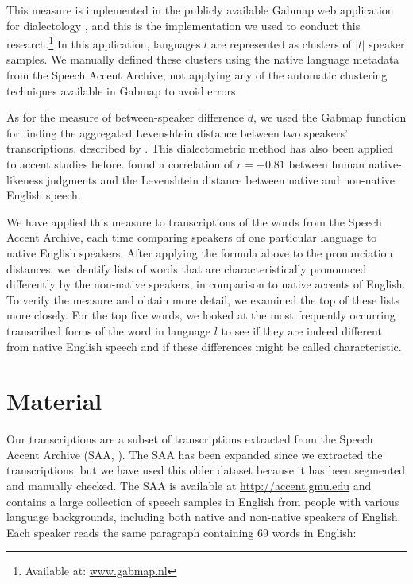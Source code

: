 \documentclass[output=paper]{LSP/langsci}
\begin{document}
This measure is implemented in the publicly available Gabmap web application for dialectology \citep{nerbonne_gabmap_2011}, and this is the implementation we used to conduct this research.\footnote{Available at: \url{www.gabmap.nl}} In this application, languages $l$ are represented as clusters of $|l|$ speaker samples. We manually defined these clusters using the native language metadata from the Speech Accent Archive, not applying any of the automatic clustering techniques available in Gabmap to avoid errors.

As for the measure of between-speaker difference $d$, we used the Gabmap function for finding the aggregated Levenshtein distance between two speakers' transcriptions, described by \citet{nerbonne_gabmap_2011}. This dialectometric method has also been applied to accent studies before. \citet{wieling_measuring_2014} found a correlation of $r = -0.81$ between human native-likeness judgments and the Levenshtein distance between native and non-native English speech.   

We have applied this measure to transcriptions of the words from the Speech Accent Archive, each time comparing speakers of one particular language to native English speakers. After applying the formula above to the pronunciation distances, we identify lists of words that are characteristically pronounced differently by the non-native speakers, in comparison to native accents of English. To verify the measure and obtain more detail, we examined the top of these lists more closely. For the top five words, we looked at the most frequently occurring transcribed forms of the word in language $l$ to see if they are indeed different from native English speech and if these differences might be called characteristic.

\section{Material}
\label{s:material}

Our transcriptions are a subset of transcriptions extracted from the Speech Accent Archive (SAA, \citealt{weinberger_speech_2011}). The SAA has been expanded since we extracted the transcriptions, but we have used this older dataset because it has been segmented and manually checked. The SAA is available at \url{http://accent.gmu.edu} and contains a large collection of speech samples in English from people with various language backgrounds, including both native and non-native speakers of English. Each speaker reads the same paragraph containing 69 words in English:
\end{document}
